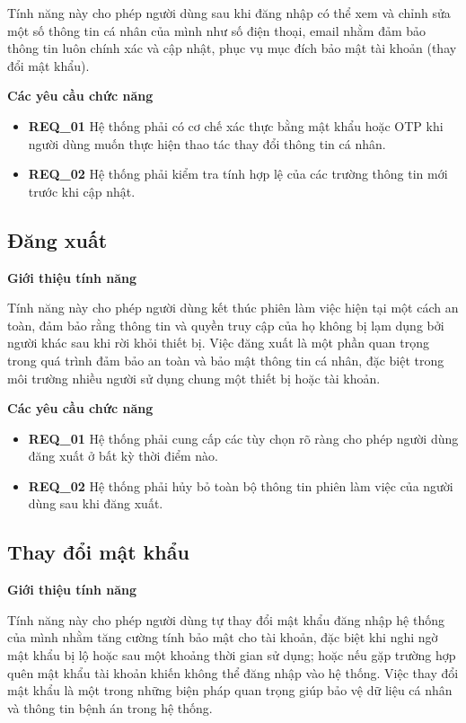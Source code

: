 Tính năng này cho phép người dùng sau khi đăng nhập có thể xem và chỉnh sửa một số thông tin cá nhân của mình như số điện thoại, email nhằm đảm bảo thông tin luôn chính xác và cập nhật, phục vụ mục đích bảo mật tài khoản (thay đổi mật khẩu).

\noindent \textbf{Các yêu cầu chức năng}

\begin{itemize}
  \item \textbf{REQ\_01} Hệ thống phải có cơ chế xác thực bằng mật khẩu hoặc OTP khi người dùng muốn thực hiện thao tác thay đổi thông tin cá nhân.
  \item \textbf{REQ\_02} Hệ thống phải kiểm tra tính hợp lệ của các trường thông tin mới trước khi cập nhật.
\end{itemize}

\subsection{Đăng xuất}

\noindent \textbf{Giới thiệu tính năng}

Tính năng này cho phép người dùng kết thúc phiên làm việc hiện tại một cách an toàn, đảm bảo rằng thông tin và quyền truy cập của họ không bị lạm dụng bởi người khác sau khi rời khỏi thiết bị. Việc đăng xuất là một phần quan trọng trong quá trình đảm bảo an toàn và bảo mật thông tin cá nhân, đặc biệt trong môi trường nhiều người sử dụng chung một thiết bị hoặc tài khoản.

\noindent \textbf{Các yêu cầu chức năng}

\begin{itemize}
  \item \textbf{REQ\_01} Hệ thống phải cung cấp các tùy chọn rõ ràng cho phép người dùng đăng xuất ở bất kỳ thời điểm nào.
  \item \textbf{REQ\_02} Hệ thống phải hủy bỏ toàn bộ thông tin phiên làm việc của người dùng sau khi đăng xuất.
\end{itemize}

\subsection{Thay đổi mật khẩu}

\noindent \textbf{Giới thiệu tính năng}

Tính năng này cho phép người dùng tự thay đổi mật khẩu đăng nhập hệ thống của mình nhằm tăng cường tính bảo mật cho tài khoản, đặc biệt khi nghi ngờ mật khẩu bị lộ hoặc sau một khoảng thời gian sử dụng; hoặc nếu gặp trường hợp quên mật khẩu tài khoản khiến không thể đăng nhập vào hệ thống. Việc thay đổi mật khẩu là một trong những biện pháp quan trọng giúp bảo vệ dữ liệu cá nhân và thông tin bệnh án trong hệ thống.

